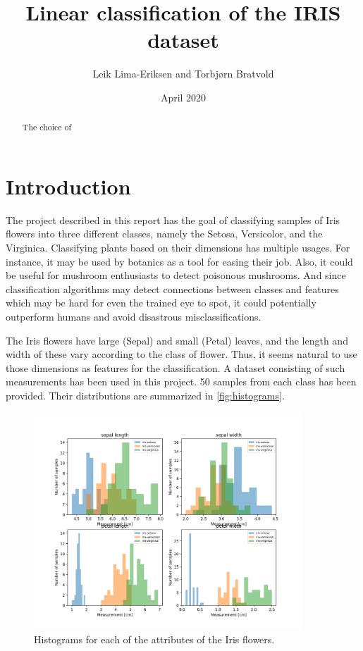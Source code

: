 \documentclass{article}
\begin{document}
\title{Linear classification of the IRIS dataset}
\author{Leik Lima-Eriksen and Torbjørn Bratvold}
\date{April 2020}

\maketitle
\begin{abstract}
    The choice of
 \end{abstract}
\newpage

\tableofcontents
\newpage

\section{Introduction}\label{sec:introduction}
The project described in this report has the goal of classifying samples of Iris flowers into
three different classes, namely the Setosa, Versicolor, and the Virginica. Classifying plants
based on their dimensions has multiple usages. For instance, it may be used by botanics as a tool
for easing their job. Also, it could be useful for mushroom enthusiasts to detect poisonous
mushrooms. And since classification algorithms may detect connections between classes and features
which may be hard for even the trained eye to spot, it could potentially outperform humans and
avoid disastrous misclassifications.

The Iris flowers have large (Sepal) and small (Petal) leaves, and the length and width of these
vary according to the class of flower. Thus, it seems natural to use those dimensions as features
for the classification. A dataset consisting of such measurements has been used in this project. 50
samples from each class has been provided. Their distributions are summarized in \autoref{fig:histograms}.

\begin{figure}[h]
    \centering
    \includegraphics[width=0.9\textwidth]{../images/iris_histograms.png}
    \caption{Histograms for each of the attributes of the Iris flowers.}
    \label{fig:histograms}
\end{figure}
\end{document}
